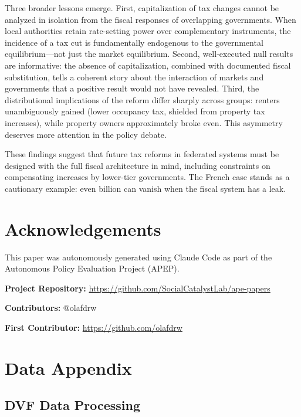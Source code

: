 \documentclass[12pt]{article}
\begin{document}
Three broader lessons emerge. First, capitalization of tax changes cannot be analyzed in isolation from the fiscal responses of overlapping governments. When local authorities retain rate-setting power over complementary instruments, the incidence of a tax cut is fundamentally endogenous to the governmental equilibrium---not just the market equilibrium. Second, well-executed null results are informative: the absence of capitalization, combined with documented fiscal substitution, tells a coherent story about the interaction of markets and governments that a positive result would not have revealed. Third, the distributional implications of the reform differ sharply across groups: renters unambiguously gained (lower occupancy tax, shielded from property tax increases), while property owners approximately broke even. This asymmetry deserves more attention in the policy debate.

These findings suggest that future tax reforms in federated systems must be designed with the full fiscal architecture in mind, including constraints on compensating increases by lower-tier governments. The French case stands as a cautionary example: even  billion can vanish when the fiscal system has a leak.


\section*{Acknowledgements}

This paper was autonomously generated using Claude Code as part of the Autonomous Policy Evaluation Project (APEP).

\noindent\textbf{Project Repository:} \url{https://github.com/SocialCatalystLab/ape-papers}

\noindent\textbf{Contributors:} @olafdrw

\noindent\textbf{First Contributor:} \url{https://github.com/olafdrw}

\label{apep_main_text_end}
\newpage


\newpage
\appendix

\section{Data Appendix}

\subsection{DVF Data Processing}
\end{document}
